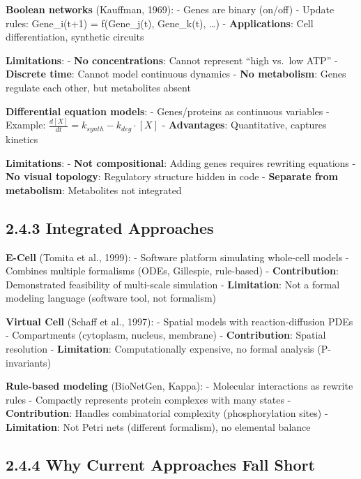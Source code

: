 \textbf{Boolean networks} (Kauffman, 1969): - Genes are binary (on/off)
- Update rules: Gene\_i(t+1) = f(Gene\_j(t), Gene\_k(t), \ldots) -
\textbf{Applications}: Cell differentiation, synthetic circuits

\textbf{Limitations}: - \textbf{No concentrations}: Cannot represent
``high vs.~low ATP'' - \textbf{Discrete time}: Cannot model continuous
dynamics - \textbf{No metabolism}: Genes regulate each other, but
metabolites absent

\textbf{Differential equation models}: - Genes/proteins as continuous
variables - Example: \(\frac{d[X]}{dt} = k_{synth} - k_{deg} \cdot [X]\)
- \textbf{Advantages}: Quantitative, captures kinetics

\textbf{Limitations}: - \textbf{Not compositional}: Adding genes
requires rewriting equations - \textbf{No visual topology}: Regulatory
structure hidden in code - \textbf{Separate from metabolism}:
Metabolites not integrated

\hypertarget{integrated-approaches}{%
\subsection{2.4.3 Integrated Approaches}\label{integrated-approaches}}

\textbf{E-Cell} (Tomita et al., 1999): - Software platform simulating
whole-cell models - Combines multiple formalisms (ODEs, Gillespie,
rule-based) - \textbf{Contribution}: Demonstrated feasibility of
multi-scale simulation - \textbf{Limitation}: Not a formal modeling
language (software tool, not formalism)

\textbf{Virtual Cell} (Schaff et al., 1997): - Spatial models with
reaction-diffusion PDEs - Compartments (cytoplasm, nucleus, membrane) -
\textbf{Contribution}: Spatial resolution - \textbf{Limitation}:
Computationally expensive, no formal analysis (P-invariants)

\textbf{Rule-based modeling} (BioNetGen, Kappa): - Molecular
interactions as rewrite rules - Compactly represents protein complexes
with many states - \textbf{Contribution}: Handles combinatorial
complexity (phosphorylation sites) - \textbf{Limitation}: Not Petri nets
(different formalism), no elemental balance

\hypertarget{why-current-approaches-fall-short}{%
\subsection{2.4.4 Why Current Approaches Fall
Short}\label{why-current-approaches-fall-short}}

